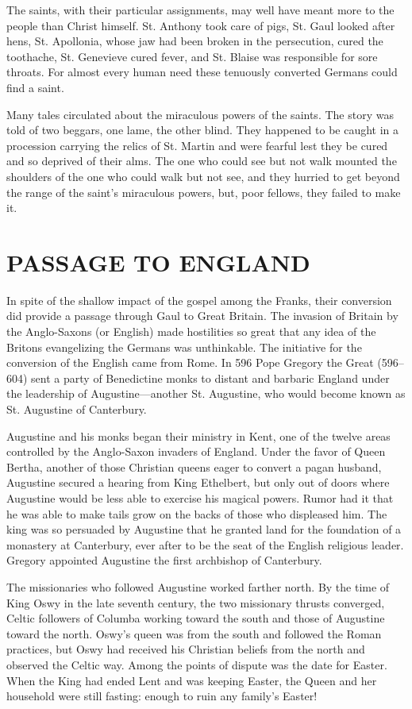 The saints, with their particular assignments, may well have meant more to the people than Christ
himself. St. Anthony took care of pigs, St. Gaul looked after hens, St. Apollonia, whose jaw had
been broken in the persecution, cured the toothache, St. Genevieve cured fever, and St. Blaise was
responsible for sore throats. For almost every human need these tenuously converted Germans could
find a saint.

Many tales circulated about the miraculous powers of the saints. The story was told of two beggars,
one lame, the other blind. They happened to be caught in a procession carrying the relics of St.
Martin and were fearful lest they be cured and so deprived of their alms. The one who could see but
not walk mounted the shoulders of the one who could walk but not see, and they hurried to get beyond
the range of the saint’s miraculous powers, but, poor fellows, they failed to make it.

\section{PASSAGE TO ENGLAND}

In spite of the shallow impact of the gospel among the Franks, their conversion did provide a
passage through Gaul to Great Britain. The invasion of Britain by the Anglo-Saxons (or English) made
hostilities so great that any idea of the Britons evangelizing the Germans was unthinkable. The
initiative for the conversion of the English came from Rome. In 596 Pope Gregory the Great (596–604)
sent a party of Benedictine monks to distant and barbaric England under the leadership of
Augustine—another St. Augustine, who would become known as St. Augustine of Canterbury.

Augustine and his monks began their ministry in Kent, one of the twelve areas controlled by the
Anglo-Saxon invaders of England. Under the favor of Queen Bertha, another of those Christian queens
eager to convert a pagan husband, Augustine secured a hearing from King Ethelbert, but only out of
doors where Augustine would be less able to exercise his magical powers. Rumor had it that he was
able to make tails grow on the backs of those who displeased him. The king was so persuaded by
Augustine that he granted land for the foundation of a monastery at Canterbury, ever after to be the
seat of the English religious leader. Gregory appointed Augustine the first archbishop of
Canterbury.

The missionaries who followed Augustine worked farther north. By the time of King Oswy in the late
seventh century, the two missionary thrusts converged, Celtic followers of Columba working toward
the south and those of Augustine toward the north. Oswy’s queen was from the south and followed the
Roman practices, but Oswy had received his Christian beliefs from the north and observed the Celtic
way. Among the points of dispute was the date for Easter. When the King had ended Lent and was
keeping Easter, the Queen and her household were still fasting: enough to ruin any family’s Easter!

